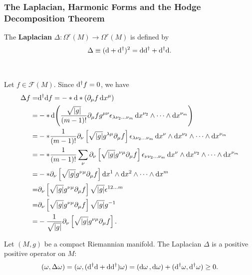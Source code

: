 \documentclass[10pt]{article}
\begin{document}
\subsubsection{The Laplacian, Harmonic Forms and the Hodge Decomposition Theorem}
\begin{definition}[Laplacian]
    The \textbf{Laplacian} $\Delta:\Omega^r(M)\to\Omega^r(M)$ is defined by
    \begin{align}
        \Delta\equiv(\mathrm{d}+\mathrm{d}^\dagger)^2=\mathrm{d}\mathrm{d}^\dagger+\mathrm{d}^\dagger\mathrm{d}.
    \end{align}
\end{definition}
\
\begin{example}
    Let $f\in\mathcal{F}(M)$.
    Since $\mathrm{d}^\dagger f=0$, we have
    \begin{align}
        \Delta f= & \mathrm{d}^\dagger\mathrm{d} f=-\ast\mathrm{d}\ast\left(\partial_\mu f\dd{x^\mu}\right)\notag                                                                                                                       \\
        =         & -\ast\dd(\frac{\sqrt{\abs{g}}}{(m-1)!}\partial_\mu fg^{\mu\nu}\epsilon_{\lambda\nu_2\dots\nu_m}\dd{x^{\nu_2}}\wedge\dots\wedge\dd{x^{\nu_m}})\notag                                            \\
        =         & -\ast\frac{1}{(m-1)!}\partial_\nu\left[\sqrt{\abs{g}}g^{\lambda\mu}\partial_\mu f\right]\epsilon_{\lambda\nu_2\dots\nu_m}\dd{x^\nu}\wedge\dd{x^{\nu_2}}\wedge\dots\wedge\dd{x^{\nu_m}}\notag   \\
        =         & -\ast\frac{1}{(m-1)!}\sum_{\nu}\partial_\nu\left[\sqrt{\abs{g}}g^{\nu\mu}\partial_\mu f\right]\epsilon_{\nu\nu_2\dots\nu_m}\dd{x^\nu}\wedge\dd{x^{\nu_2}}\wedge\dots\wedge\dd{x^{\nu_m}}\notag \\
        =         & -\ast\partial_\nu\left[\sqrt{\abs{g}}g^{\nu\mu}\partial_\mu f\right]\dd{x^1}\wedge\dd{x^{2}}\wedge\dots\wedge\dd{x^{m}}\notag                                                                  \\
        =         & \partial_\nu\left[\sqrt{\abs{g}}g^{\nu\mu}\partial_\mu f\right]\sqrt{\abs{g}}\epsilon^{12\dots m}\notag                                                                                        \\
        =         & \partial_\nu\left[\sqrt{\abs{g}}g^{\nu\mu}\partial_\mu f\right]\sqrt{\abs{g}}g^{-1}\notag                                                                                                      \\
        =         & -\frac{1}{\sqrt{\abs{g}}}\partial_\nu\left[\sqrt{\abs{g}}g^{\nu\mu}\partial_\mu f\right].
    \end{align}
\end{example}
\begin{property}
    Let $(M,g)$ be a compact Riemannian manifold.
    The Laplacian $\Delta$ is a positive positive operator on $M$:
    \begin{align}
        (\omega,\Delta\omega)=(\omega,(\mathrm{d}^\dagger\mathrm{d}+\mathrm{d}\mathrm{d}^\dagger)\omega)=(\dd{\omega},\dd{\omega})+(\mathrm{d}^\dagger\omega,\mathrm{d}^\dagger\omega)\geq0.
    \end{align}
\end{property}
\end{document}
